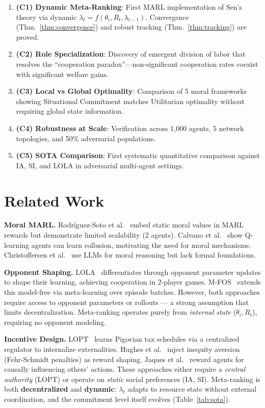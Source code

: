 \documentclass{article}
\begin{document}
\begin{enumerate}
    \item \textbf{(C1) Dynamic Meta-Ranking}: First MARL implementation of Sen's theory via dynamic $\lambda_t{=}f(\theta_i, R_t, \lambda_{t-1})$. Convergence (Thm.~\ref{thm:convergence}) and robust tracking (Thm.~\ref{thm:tracking}) are proved.
    \item \textbf{(C2) Role Specialization}: Discovery of emergent division of labor that resolves the ``cooperation paradox''---non-significant cooperation rates
    coexist with significant welfare gains.
    \item \textbf{(C3) Local vs Global Optimality}: Comparison of 5 moral frameworks showing Situational Commitment matches Utilitarian optimality without requiring global state information.
    \item \textbf{(C4) Robustness at Scale}: Verification across 1,000 agents, 5 network topologies, and 50\% adversarial populations.
    \item \textbf{(C5) SOTA Comparison}: First systematic quantitative comparison against IA, SI, and LOLA in adversarial multi-agent settings.
\end{enumerate}

\section{Related Work}

\textbf{Moral MARL.}
Rodr\'iguez-Soto et al.~\cite{rodriguez2021multi} embed static moral values in MARL rewards but demonstrate limited scalability (2 agents).
Calvano et al.~\cite{calvano2020artificial} show Q-learning agents can learn collusion, motivating the need for moral mechanisms.
Christoffersen et al.~\cite{christoffersen2023get} use LLMs for moral reasoning but lack formal foundations.

\textbf{Opponent Shaping.}
LOLA~\cite{foerster2018lola} differentiates through opponent parameter updates to shape their learning, achieving cooperation in 2-player games.
M-FOS~\cite{lu2022mfos} extends this model-free via meta-learning over episode batches.
However, both approaches require access to opponent parameters or rollouts --- a strong assumption that limits decentralization.
Meta-ranking operates purely from \textit{internal state} ($\theta_i, R_t$), requiring no opponent modeling.

\textbf{Incentive Design.}
LOPT~\cite{yang2023lopt} learns Pigovian tax schedules via a centralized regulator to internalize externalities.
Hughes et al.~\cite{hughes2018inequity} inject inequity aversion (Fehr-Schmidt penalties) as reward shaping.
Jaques et al.~\cite{jaques2019social} reward agents for causally influencing others' actions.
These approaches either require a \textit{central authority} (LOPT) or operate on \textit{static} social preferences (IA, SI).
Meta-ranking is both \textbf{decentralized} and \textbf{dynamic}: $\lambda_t$ adapts to resource state without external coordination, and the commitment level itself evolves (Table~\ref{tab:sota}).
\end{document}
